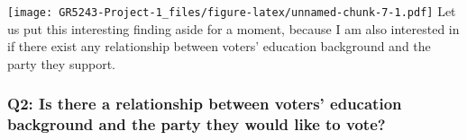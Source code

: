 \documentclass[
]{article}
\newenvironment{Shaded}{\begin{snugshade}}{\end{snugshade}}
\newcommand{\DataTypeTok}[1]{\textcolor[rgb]{0.13,0.29,0.53}{#1}}
\newcommand{\DecValTok}[1]{\textcolor[rgb]{0.00,0.00,0.81}{#1}}
\newcommand{\KeywordTok}[1]{\textcolor[rgb]{0.13,0.29,0.53}{\textbf{#1}}}
\newcommand{\NormalTok}[1]{#1}
\newcommand{\OperatorTok}[1]{\textcolor[rgb]{0.81,0.36,0.00}{\textbf{#1}}}
\newcommand{\StringTok}[1]{\textcolor[rgb]{0.31,0.60,0.02}{#1}}
\begin{document}
\begin{Shaded}
\end{Shaded}

\texttt{[image: GR5243-Project-1\_files/figure-latex/unnamed-chunk-7-1.pdf]}
Let us put this interesting finding aside for a moment, because I am
also interested in if there exist any relationship between voters'
education background and the party they support.

\hypertarget{q2-is-there-a-relationship-between-voters-education-background-and-the-party-they-would-like-to-vote}{%
\subsubsection{Q2: Is there a relationship between voters' education
background and the party they would like to
vote?}\label{q2-is-there-a-relationship-between-voters-education-background-and-the-party-they-would-like-to-vote}}
\end{document}
